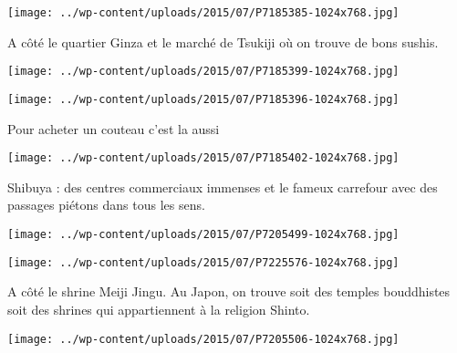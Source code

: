  

\begin{center} \texttt{[image: ../wp-content/uploads/2015/07/P7185385-1024x768.jpg]} \end{center}

 

 A côté le quartier Ginza et le marché de Tsukiji où on trouve de bons sushis. 

 

\begin{center} \texttt{[image: ../wp-content/uploads/2015/07/P7185399-1024x768.jpg]} \end{center}

 

 

\begin{center} \texttt{[image: ../wp-content/uploads/2015/07/P7185396-1024x768.jpg]} \end{center}

 

 Pour acheter un couteau c'est la aussi 

 

\begin{center} \texttt{[image: ../wp-content/uploads/2015/07/P7185402-1024x768.jpg]} \end{center}

 

 Shibuya : des centres commerciaux immenses et le fameux carrefour avec des passages piétons dans tous les sens. 

 

\begin{center} \texttt{[image: ../wp-content/uploads/2015/07/P7205499-1024x768.jpg]} \end{center}

 

 

\begin{center} \texttt{[image: ../wp-content/uploads/2015/07/P7225576-1024x768.jpg]} \end{center}

 

 A côté le shrine Meiji Jingu. Au Japon, on trouve soit des temples bouddhistes soit des shrines qui appartiennent à la religion Shinto. 

 

\begin{center} \texttt{[image: ../wp-content/uploads/2015/07/P7205506-1024x768.jpg]} \end{center}

